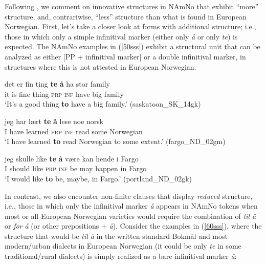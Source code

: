 \documentclass[output=paper,colorlinks,citecolor=brown]{langscibook}
\begin{document}
Following \citet{putsoft}, we comment on innovative structures in NAmNo that exhibit “more” structure, and, contrariwise, “less” structure than what is found in European Norwegian. First, let's take a closer look at forms with additional structure; i.e., those in which only a simple infinitival marker (either only \textit{\aa} or only \textit{te}) is expected. The NAmNo examples in (\ref{50sss}) exhibit a structural unit that can be analyzed as either [PP + infinitival marker] or a double infinitival marker, in structures where this is not attested in European Norwegian.

\begin{exe}

\item \label{50sss}

\begin{xlist}

\item \gll det er fin ting \textbf{te} \textbf{å} ha stor family  \\
        it is fine thing \textsc{prp} \textsc{inf} have big family \\
         \glt `It's a good thing \textbf{to} have a big family.' \hfill(saskatoon\_SK\_14gk)\label{ex57}

\item \gll jeg har lært \textbf{te} \textbf{å} lese noe norsk  \\
        I have learned \textsc{prp} \textsc{inf} read some Norwegian\\
         \glt `I have learned \textbf{to} read Norwegian to some extent.' \hfill(fargo\_ND\_02gm)\label{ex52}

\item \gll jeg skulle like \textbf{te} \textbf{å} være kan hende i Fargo \\
        I should like \textsc{prp} \textsc{inf} be may happen in Fargo \\
         \glt `I would like \textbf{to} be, maybe, in Fargo.' \hfill(portland\_ND\_02gk) \label{ex53}


\end{xlist}

\end{exe}

In contrast, we also encounter non-finite clauses  that display \textit{reduced} structure, i.e., those in which only the infinitival marker \textit{\aa} appears in NAmNo tokens when most or all European Norwegian varieties would require the combination of \textit{til \aa} or \textit{for \aa} (or other prepositions + \textit{\aa}). Consider the examples in (\ref{60sss}), where the structure that would be \textit{til \aa} in the written standard Bokm{\aa}l and most modern/urban dialects in European Norwegian (it could be only \textit{te} in some traditional/rural dialects) is simply realized as a bare infinitival marker \textit{\aa}:
\end{document}
